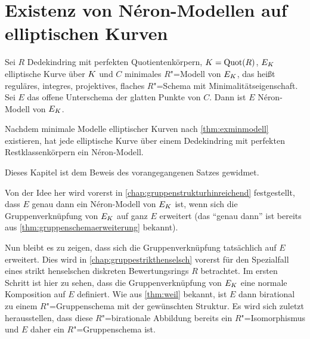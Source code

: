 \chapter{Existenz von Néron-Modellen auf elliptischen Kurven}
\label{chap:exneronmodelle}
\begin{Theorem}\label{thm:exneronmodelle}

  Sei $R$ Dedekindring mit perfekten Quotientenkörpern,
  ${K=\operatorname{Quot}(R)}$, $E_{K}$ elliptische Kurve über $K$ und $C$ minimales
  $R$"=Modell von $E_{K}$,
  das heißt reguläres, integres, projektives,
  flaches $R$"=Schema mit Minimalitätseigenschaft.
  Sei $E$ das offene Unterschema der glatten Punkte von $C$.
  Dann ist $E$ Néron-Modell von $E_{K}$.

  Nachdem minimale Modelle elliptischer
  Kurven nach \ref{thm:exminmodell} existieren, hat jede
  elliptische Kurve über einem Dedekindring mit perfekten
  Restklassenkörpern ein Néron-Modell.
\end{Theorem}
Dieses Kapitel ist dem Beweis des vorangegangenen Satzes gewidmet.

Von der Idee her wird vorerst in
\autoref{chap:gruppenstrukturhinreichend} festgestellt, dass $E$ genau 
dann ein Néron-Modell von $E_{K}$ ist, wenn sich die Gruppenverknüpfung
von $E_{K}$ auf ganz $E$ erweitert (das \enquote{genau dann} ist
bereits aus \ref{thm:gruppenschemaerweiterung} bekannt).

Nun bleibt es zu zeigen, dass sich die Gruppenverknüpfung tatsächlich
auf $E$ erweitert.
Dies wird in \autoref{chap:gruppestrikthenselsch} vorerst für
den Spezialfall eines strikt henselschen diskreten Bewertungsrings
$R$ betrachtet. Im ersten Schritt ist hier zu sehen, dass die
Gruppenverknüpfung von $E_{K}$ eine normale Komposition auf $E$
definiert. Wie aus \ref{thm:weil} bekannt, ist $E$ dann birational zu
einem $R$"=Gruppenschema mit der gewünschten Struktur. Es wird sich
zuletzt herausstellen, dass diese $R$"=birationale Abbildung bereits
ein $R$"=Isomorphismus und $E$ daher ein $R$"=Gruppenschema ist.

